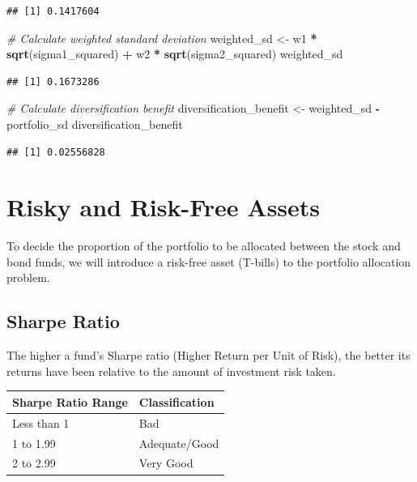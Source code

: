\documentclass[
]{book}
\newenvironment{Shaded}{\begin{snugshade}}{\end{snugshade}}
\newcommand{\CommentTok}[1]{\textcolor[rgb]{0.56,0.35,0.01}{\textit{#1}}}
\newcommand{\FunctionTok}[1]{\textcolor[rgb]{0.13,0.29,0.53}{\textbf{#1}}}
\newcommand{\NormalTok}[1]{#1}
\newcommand{\OtherTok}[1]{\textcolor[rgb]{0.56,0.35,0.01}{#1}}
\newcommand{\SpecialCharTok}[1]{\textcolor[rgb]{0.81,0.36,0.00}{\textbf{#1}}}
\begin{document}
\begin{verbatim}
## [1] 0.1417604
\end{verbatim}

\begin{Shaded}
\begin{Highlighting}[]
\CommentTok{\# Calculate weighted standard deviation}
\NormalTok{weighted\_sd }\OtherTok{\textless{}{-}}\NormalTok{ w1 }\SpecialCharTok{*} \FunctionTok{sqrt}\NormalTok{(sigma1\_squared) }\SpecialCharTok{+}\NormalTok{ w2 }\SpecialCharTok{*} \FunctionTok{sqrt}\NormalTok{(sigma2\_squared)}
\NormalTok{weighted\_sd}
\end{Highlighting}
\end{Shaded}

\begin{verbatim}
## [1] 0.1673286
\end{verbatim}

\begin{Shaded}
\begin{Highlighting}[]
\CommentTok{\# Calculate diversification benefit}
\NormalTok{diversification\_benefit }\OtherTok{\textless{}{-}}\NormalTok{ weighted\_sd }\SpecialCharTok{{-}}\NormalTok{ portfolio\_sd}
\NormalTok{diversification\_benefit}
\end{Highlighting}
\end{Shaded}

\begin{verbatim}
## [1] 0.02556828
\end{verbatim}

\hypertarget{risky-and-risk-free-assets}{%
\section{Risky and Risk-Free Assets}\label{risky-and-risk-free-assets}}

To decide the proportion of the portfolio to be allocated between the
stock and bond funds, we will introduce a risk-free asset (T-bills) to
the portfolio allocation problem.

\hypertarget{sharpe-ratio}{%
\subsection{Sharpe Ratio}\label{sharpe-ratio}}

The higher a fund's Sharpe ratio (Higher Return per Unit of Risk), the
better its returns have been relative to the amount of investment risk
taken.

\begin{longtable}[]{@{}ll@{}}
\toprule\noalign{}
Sharpe Ratio Range & Classification \\
\midrule\noalign{}
\endhead
\bottomrule\noalign{}
\endlastfoot
Less than 1 & Bad \\
1 to 1.99 & Adequate/Good \\
2 to 2.99 & Very Good \\
\end{longtable}
\end{document}
